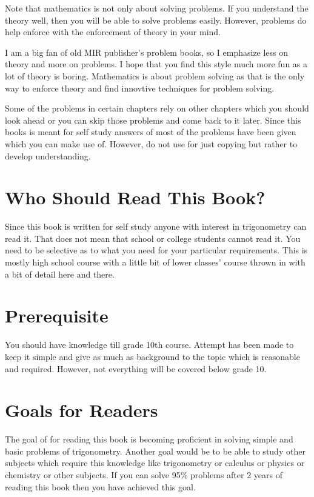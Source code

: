 Note that mathematics is not only about solving problems. If you understand the theory well, then you will be able to solve
problems easily. However, problems do help enforce with the enforcement of theory in your mind.

I am a big fan of old MIR publisher's problem books, so I emphasize less on theory and more on problems. I hope that you find
this style much more fun as a lot of theory is boring. Mathematics is about problem solving as that is the only way to
enforce theory and find innovtive techniques for problem solving.

Some of the problems in certain chapters rely on other chapters which you should look ahead or you can skip those problems and come
back to it later. Since this books is meant for self study answers of most of the problems have been given which you can make use of.
However, do not use for just copying but rather to develop understanding.

\section*{Who Should Read This Book?}
Since this book is written for self study anyone with interest in trigonometry can read it. That does not mean that school or
college students cannot read it. You need to be selective as to what you need for your particular requirements. This is mostly high
school course with a little bit of lower classes' course thrown in with a bit of detail here and there.

\section*{Prerequisite}
You should have knowledge till grade 10th course. Attempt has been made to keep it simple and give as much as background to the
topic which is reasonable and required. However, not everything will be covered below grade 10.

\section*{Goals for Readers}
The goal of for reading this book is becoming proficient in solving simple and basic problems of trigonometry. Another goal would
be to be able to study other subjects which require this knowledge like trigonometry or calculus or physics or chemistry or other
subjects. If you can solve 95\% problems after 2 years of reading this book then you have achieved this goal.

